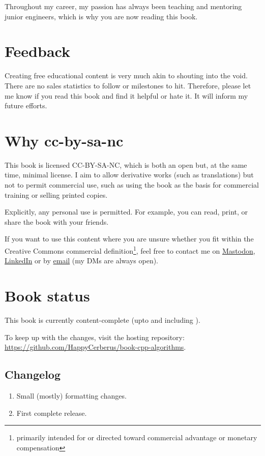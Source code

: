 Throughout my career, my passion has always been teaching and mentoring junior engineers, which is why you are now reading this book.

\section*{Feedback}

Creating free educational content is very much akin to shouting into the void. There are no sales statistics to follow or milestones to hit. Therefore, please let me know if you read this book and find it helpful or hate it. It will inform my future efforts.

\section*{Why cc-by-sa-nc}

This book is licensed CC-BY-SA-NC, which is both an open but, at the same time, minimal license. I aim to allow derivative works (such as translations) but not to permit commercial use, such as using the book as the basis for commercial training or selling printed copies.

Explicitly, any personal use is permitted. For example, you can read, print, or share the book with your friends.

If you want to use this content where you are unsure whether you fit within the Creative Commons commercial definition\footnote{primarily intended for or directed toward commercial advantage or monetary compensation}, feel free to contact me on \href{https://hachyderm.io/@simontoth}{Mastodon}, \href{https://cz.linkedin.com/in/simontoth}{LinkedIn} or by \href{mailto:business@simontoth.eu}{email} (my DMs are always open).

\section*{Book status}

This book is currently content-complete (upto and including ).

To keep up with the changes, visit the hosting repository: \url{https://github.com/HappyCerberus/book-cpp-algorithms}.

\subsection*{Changelog}

\begin{enumerate}
    \item[1.0.1] Small (mostly) formatting changes.
    \item[1.0.0] First complete release.
\end{enumerate}